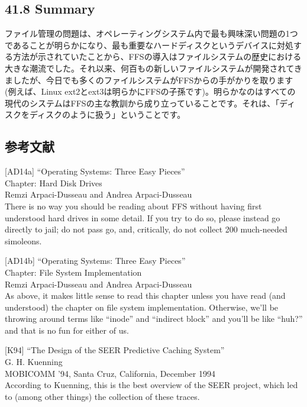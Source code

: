 \hypertarget{summary-28}{%
\subsection*{41.8 Summary}\label{summary-28}}

ファイル管理の問題は、オペレーティングシステム内で最も興味深い問題の1つであることが明らかになり、最も重要なハードディスクというデバイスに対処する方法が示されていたことから、FFSの導入はファイルシステムの歴史における大きな潮流でした。それ以来、何百もの新しいファイルシステムが開発されてきましたが、今日でも多くのファイルシステムがFFSからの手がかりを取ります(例えば、Linux
ext2とext3は明らかにFFSの子孫です)。明らかなのはすべての現代のシステムはFFSの主な教訓から成り立っていることです。それは、「ディスクをディスクのように扱う」ということです。

\hypertarget{ux53c2ux8003ux6587ux732e-28}{%
\subsection*{参考文献}\label{ux53c2ux8003ux6587ux732e-28}}

{[}AD14a{]} ``Operating Systems: Three Easy Pieces''\\
Chapter: Hard Disk Drives\\
Remzi Arpaci-Dusseau and Andrea Arpaci-Dusseau\\
There is no way you should be reading about FFS without having first
understood hard drives in some detail. If you try to do so, please
instead go directly to jail; do not pass go, and, critically, do not
collect 200 much-needed simoleons.

{[}AD14b{]} ``Operating Systems: Three Easy Pieces''\\
Chapter: File System Implementation\\
Remzi Arpaci-Dusseau and Andrea Arpaci-Dusseau\\
As above, it makes little sense to read this chapter unless you have
read (and understood) the chapter on file system implementation.
Otherwise, we'll be throwing around terms like ``inode'' and ``indirect
block'' and you'll be like ``huh?'' and that is no fun for either of us.

{[}K94{]} ``The Design of the SEER Predictive Caching System''\\
G. H. Kuenning\\
MOBICOMM '94, Santa Cruz, California, December 1994\\
According to Kuenning, this is the best overview of the SEER project,
which led to (among other things) the collection of these traces.

